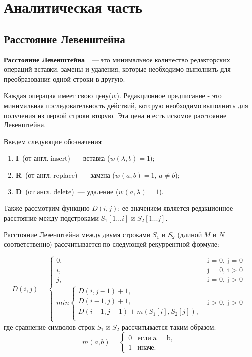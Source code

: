 \chapter{Аналитическая часть}
\section{Расстояние Левенштейна}

\textbf{Расстояние Левенштейна}~\cite{levenshtein}~--- это минимальное количество редакторских операций вставки, замены и удаления, которые необходимо выполнить для преобразования одной строки в другую. 

Каждая операция имеет свою цену($w$). Редакционное предписание - это минимальная последовательность действий, которую необходимо выполнить для получения из первой строки вторую. Эта цена и есть искомое расстояние Левенштейна.

Введем следующие обозначения:
\begin{enumerate}[label=\arabic*)]
    \item \textbf{I}~(от англ. insert)~--- вставка ($w(\lambda, b) = 1$);
    \item \textbf{R}~(от англ. replace)~--- замена ($w(a, b) = 1$, $a \neq b$);
    \item \textbf{D}~(от англ. delete)~--- удаление ($w(a, \lambda) = 1$).
\end{enumerate}

Также рассмотрим функцию $D(i, j)$: ее значением является
редакционное расстояние между подстроками $S_1[1...i]$ и $S_2[1...j]$.

Расстояние Левенштейна между двумя строками $S_{1}$ и $S_{2}$ (длиной $M$ и $N$ соответственно) рассчитывается по следующей рекуррентной формуле:

\begin{equation}
	\label{eq:L}
	D(i, j) =
	\begin{cases}
		0, &\text{i = 0, j = 0}\\
		i, &\text{j = 0, i > 0}\\
		j, &\text{i = 0, j > 0}\\
		min \begin{cases}
			D(i, j - 1) + 1,\\
			D(i - 1, j) + 1,\\
			D(i - 1, j - 1) +  m(S_{1}[i], S_{2}[j]), \\
		\end{cases}
		&\text{i > 0, j > 0}
	\end{cases}
\end{equation}
где сравнение символов строк $S_1$ и $S_2$ рассчитывается таким образом:
\begin{equation}
	\label{eq:m}
	m(a, b) = \begin{cases}
		0 &\text{если a = b,}\\
		1 &\text{иначе.}
	\end{cases}
\end{equation}

